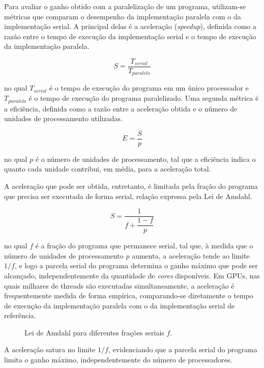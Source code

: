 Para avaliar o ganho obtido com a paralelização de um programa, utilizam-se métricas que comparam o desempenho da implementação paralela com o da implementação serial. A principal delas é a aceleração (\textit{speedup}), definida como a razão entre o tempo de execução da implementação serial e o tempo de execução da implementação paralela.

\begin{equation}\label{eqn:speedup}
    S = \frac{T_{serial}}{T_{paralelo}}
\end{equation}

no qual $T_{serial}$ é o tempo de execução do programa em um único processador e $T_{paralelo}$ é o tempo de execução do programa paralelizado. Uma segunda métrica é a eficiência, definida como a razão entre a aceleração obtida e o número de unidades de processamento utilizadas.

\begin{equation}\label{eqn:eficiencia}
    E = \frac{S}{p}
\end{equation}

no qual $p$ é o número de unidades de processamento, tal que a eficiência indica o quanto cada unidade contribui, em média, para a aceleração total.

A aceleração que pode ser obtida, entretanto, é limitada pela fração do programa que precisa ser executada de forma serial, relação expressa pela Lei de Amdahl.

\begin{equation}\label{eqn:amdahl}
    S = \frac{1}{f + \dfrac{1 - f}{p}}
\end{equation}

no qual $f$ é a fração do programa que permanece serial, tal que, à medida que o número de unidades de processamento $p$ aumenta, a aceleração tende ao limite $1/f$, e logo a parcela serial do programa determina o ganho máximo que pode ser alcançado, independentemente da quantidade de \textit{cores} disponíveis. Em GPUs, nas quais milhares de threads são executadas simultaneamente, a aceleração é frequentemente medida de forma empírica, comparando-se diretamente o tempo de execução da implementação paralela com o da implementação serial de referência.

\begin{figure}[H]
\centering
\caption{Lei de Amdahl para diferentes frações seriais $f$.}
\label{fig:amdahl}
\end{figure}

A aceleração satura no limite $1/f$, evidenciando que a parcela serial do programa limita o ganho máximo, independentemente do número de processadores.
